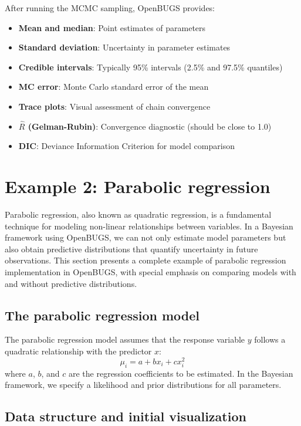 After running the MCMC sampling, OpenBUGS provides:

\begin{itemize}
    \item \textbf{Mean and median}: Point estimates of parameters
    \item \textbf{Standard deviation}: Uncertainty in parameter estimates
    \item \textbf{Credible intervals}: Typically 95\% intervals (2.5\% and 97.5\% quantiles)
    \item \textbf{MC error}: Monte Carlo standard error of the mean
    \item \textbf{Trace plots}: Visual assessment of chain convergence
    \item \textbf{$\hat{R}$ (Gelman-Rubin)}: Convergence diagnostic (should be close to 1.0)
    \item \textbf{DIC}: Deviance Information Criterion for model comparison
\end{itemize}

\section{Example 2: Parabolic regression}

Parabolic regression, also known as quadratic regression, is a fundamental technique for modeling non-linear relationships between variables. In a Bayesian framework using OpenBUGS, we can not only estimate model parameters but also obtain predictive distributions that quantify uncertainty in future observations. This section presents a complete example of parabolic regression implementation in OpenBUGS, with special emphasis on comparing models with and without predictive distributions.

\subsection{The parabolic regression model}

The parabolic regression model assumes that the response variable $y$ follows a quadratic relationship with the predictor $x$:
\begin{equation}
\mu_i = a + bx_i + cx_i^2
\end{equation}
where $a$, $b$, and $c$ are the regression coefficients to be estimated. In the Bayesian framework, we specify a likelihood and prior distributions for all parameters.

\subsection{Data structure and initial visualization}

